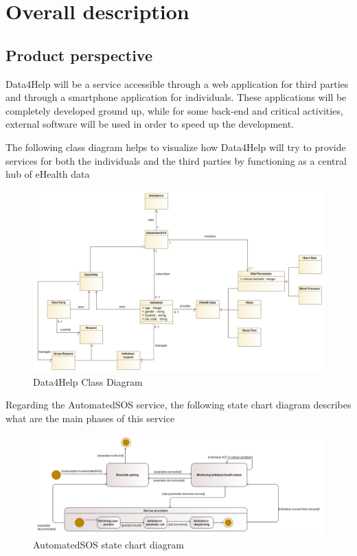 \chapter{Overall description}
\section{Product perspective}
Data4Help will be a service accessible through a web application for third parties and through a smartphone application for individuals. These applications will be completely developed ground up, while for some back-end and critical activities, external software will be used in order to speed up the development.


The following class diagram helps to visualize how Data4Help will try to provide services for both the individuals and the third parties by functioning as a central hub of eHealth data

\begin{figure}[H]
  \includegraphics[width=1\linewidth]{resources/UML/Data4HelpClassDiagram.png}
  \caption{Data4Help Class Diagram}
  \label{fig: Data4Help Class diagram}
\end{figure}

Regarding the AutomatedSOS service, the following state chart diagram describes what are the main phases of this service

\begin{figure}[H]
  \includegraphics[width=\linewidth]{resources/UML/AutomatedSOSstatechart.png}
  \caption{AutomatedSOS state chart diagram}
  \label{fig: AutoamtedSOS state chart diagram}
\end{figure}


